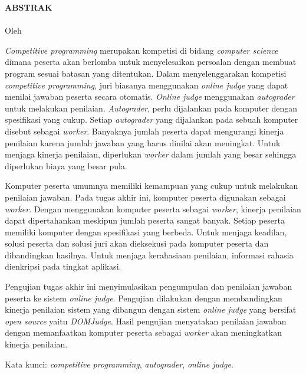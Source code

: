 \clearpage

\begin{center}
    \Large {\bfseries{\MakeUppercase{Abstrak}}} \\
    \large {\MakeUppercase{\thetitle}} \\
    \normalsize Oleh \theauthor
\end{center}

\par \textit{Competitive programming} merupakan kompetisi di bidang \textit{computer science} dimana peserta akan berlomba untuk menyelesaikan persoalan dengan membuat program sesuai batasan yang ditentukan. Dalam menyelenggarakan kompetisi \textit{competitive programming}, juri biasanya menggunakan \textit{online judge} yang dapat menilai jawaban peserta secara otomatis. \textit{Online judge} menggunakan \textit{autograder} untuk melakukan penilaian. \textit{Autograder}, perlu dijalankan pada komputer dengan spesifikasi yang cukup. Setiap \textit{autograder} yang dijalankan pada sebuah komputer disebut sebagai \textit{worker}. Banyaknya jumlah peserta dapat mengurangi kinerja penilaian karena jumlah jawaban yang harus dinilai akan meningkat. Untuk menjaga kinerja penilaian, diperlukan \textit{worker} dalam jumlah yang besar sehingga diperlukan biaya yang besar pula. 

\par Komputer peserta umumnya memiliki kemampuan yang cukup untuk melakukan penilaian jawaban. Pada tugas akhir ini, komputer peserta digunakan sebagai \textit{worker}. Dengan menggunakan komputer peserta sebagai \textit{worker}, kinerja penilaian dapat dipertahankan meskipun jumlah peserta sangat banyak. Setiap peserta memiliki komputer dengan spesifikasi yang berbeda. Untuk menjaga keadilan, solusi peserta dan solusi juri akan dieksekusi pada komputer peserta dan dibandingkan hasilnya. Untuk menjaga kerahasiaan penilaian, informasi rahasia dienkripsi pada tingkat aplikasi.

\par Pengujian tugas akhir ini menyimulasikan pengumpulan dan penilaian jawaban peserta ke sistem \textit{online judge}. Pengujian dilakukan dengan membandingkan kinerja penilaian sistem yang dibangun dengan sistem \textit{online judge} yang bersifat \textit{open source} yaitu \textit{DOMJudge}. Hasil pengujian menyatakan penilaian jawaban dengan memanfaatkan komputer peserta sebagai \textit{worker} akan meningkatkan kinerja penilaian.

\par Kata kunci: \textit{competitive programming}, \textit{autograder}, \textit{online judge}.

\clearpage